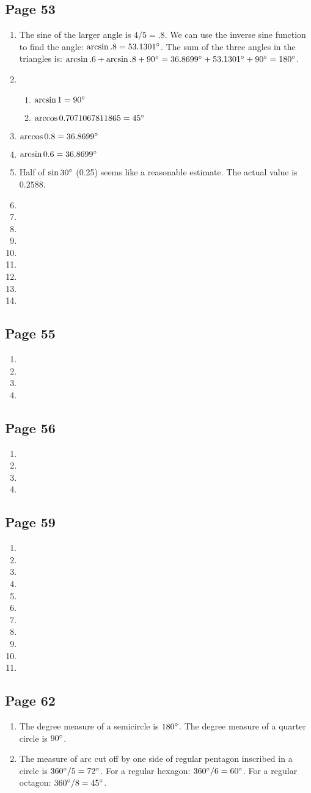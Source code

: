 \documentclass{article}
\newenvironment{solutions}[1]
{\subsection*{#1}
 \begin{enumerate}[leftmargin=1.5em]}
{\end{enumerate}}
\newcommand{\solution}{\item}
\newenvironment{subsolutions}
{\begin{enumerate}}
{\end{enumerate}}
\begin{document}
\begin{solutions}{Page 53}
\solution %
The sine of the larger angle is $4/5=.8$. We can use the inverse sine function to find the angle: $\arcsin{.8} = 53.1301\degree$. The sum of the three angles in the triangles is: $\arcsin{.6} + \arcsin{.8} + 90\degree = 36.8699\degree + 53.1301\degree + 90\degree = 180\degree$.

\solution %
\begin{subsolutions}
\item $\arcsin{1} = 90\degree$
\item $\arccos{0.7071067811865} = 45\degree$
\end{subsolutions}

\solution %
$\arccos{0.8} = 36.8699\degree$

\solution %
$\arcsin{0.6} = 36.8699\degree$

\solution %
Half of $\sin{30\degree}$ (0.25) seems like a reasonable estimate. The actual value is $0.2588$.

\solution %

\solution %

\solution %

\solution %

\solution %

\solution %

\solution %

\solution %

\solution %

\end{solutions}

\begin{solutions}{Page 55}
\solution
\solution
\solution
\solution
\end{solutions}

\begin{solutions}{Page 56}
\solution
\solution
\solution
\solution
\end{solutions}

\begin{solutions}{Page 59}
\solution
\solution
\solution
\solution
\solution
\solution
\solution
\solution
\solution
\solution
\solution
\end{solutions}

\begin{solutions}{Page 62}
\solution %
The degree measure of a semicircle is $180\degree$. The degree measure of a quarter circle is $90\degree$.
\solution %
The measure of arc cut off by one side of regular pentagon inscribed in a circle is $360\degree/5 = 72\degree$.
For a regular hexagon: $360\degree/6 = 60\degree$.
For a regular octagon: $360\degree/8 = 45\degree$.
\end{solutions}
\end{document}
